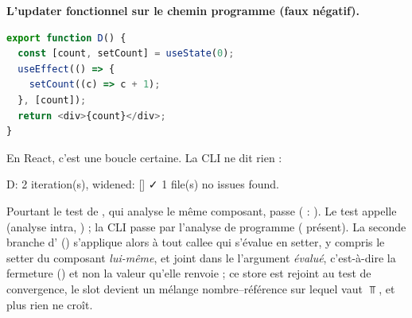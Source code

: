 \begin{piege}
\textbf{L'updater fonctionnel sur le chemin programme (faux négatif).}
\begin{lstlisting}[language=TypeScript,caption={\code{D} : un updater dans un effet gardé par l'état qu'il écrit (\file{/tmp/ch02/updater.tsx}, imports omis)},label={lst:react-modele-updater}]
export function D() {
  const [count, setCount] = useState(0);
  useEffect(() => {
    setCount((c) => c + 1);
  }, [count]);
  return <div>{count}</div>;
}
\end{lstlisting}
En React, c'est une boucle certaine. La CLI ne dit rien :
\begin{sortie}
  [verbose] D: 2 iteration(s), widened: []
✓  1 file(s) no issues found.
\end{sortie}
Pourtant le test  de
, qui analyse le même composant, passe
( : ). Le test appelle
 (analyse intra, ) ; la CLI passe par
l'analyse de programme ( présent). La seconde branche
d' ()
s'applique alors à tout callee qui s'évalue en setter, y compris le setter du
composant \emph{lui-même}, et joint dans le 
l'argument \emph{évalué}, c'est-à-dire la fermeture 
() et non la valeur qu'elle renvoie ; ce store est rejoint au
test de convergence, le slot devient un mélange nombre--référence sur lequel
 vaut $\Top$, et plus rien ne croît.
\end{piege}

